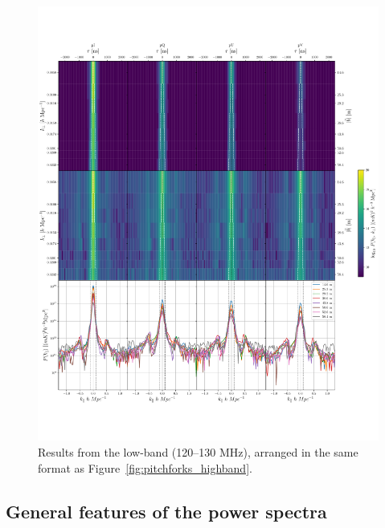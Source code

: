 \documentclass[twocolumn, trackchanges]{aastex61}
\begin{document}
{\begin{figure}[h]
\centering
\includegraphics[scale=0.45]{lowband_8day_LST_105_230.pdf}
\caption{Results from the low-band (120--130 MHz), arranged in the same format as Figure~\ref{fig:pitchforks_highband}.}
\label{fig:pitchforks_lowband}
\end{figure}

\subsection{General features of the power spectra}
\label{subsec:general_features}

}
\end{document}
